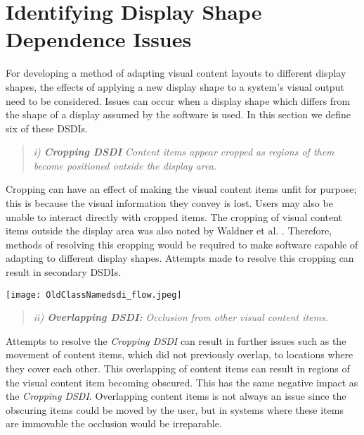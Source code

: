 \documentclass[review,5p,times,twocolumn]{elsarticle}
\begin{document}
\section{Identifying Display Shape Dependence Issues}
\label{sec:problem}

For developing a method of adapting visual content layouts to different display shapes, the effects of applying a new display shape to a system's visual output need to be considered.
Issues can occur when a display shape which differs from the shape of a display assumed by the software is used.
In this section we define six of these \acp{DSDI}.

\begin{quote}\emph{i) \textbf{Cropping \ac{DSDI}} Content items appear cropped as regions of them become positioned outside the display area.}\end{quote}

Cropping can have an effect of making the visual content items unfit for purpose; this is because the visual information they convey is lost.
Users may also be unable to interact directly with cropped items.
The cropping of visual content items outside the display area was also noted by Waldner et al. \cite{Waldner2011}.
Therefore, methods of resolving this cropping would be required to make software capable of adapting to different display shapes.
Attempts made to resolve this cropping can result in secondary \acp{DSDI}.

 \begin{figure*}[t]
 \centering
   \texttt{[image: OldClassNamedsdi\_flow.jpeg]}
   \caption{A flow chat mapping the causality of Display Shape Dependence Issues (DSDIs).}
   \label{fig:dsdiFlow}
\end{figure*}

\begin{quote}\emph{ii) \textbf{Overlapping \ac{DSDI}:} Occlusion from other visual content items.}\end{quote}

Attempts to resolve the {\emph{Cropping \ac{DSDI}}} can result in further issues such as the movement of content items, which did not previously overlap, to locations where they cover each other.
This overlapping of content items can result in regions of the visual content item becoming obscured.
This has the same negative impact as the {\emph{Cropping \ac{DSDI}}}.
Overlapping content items is not always an issue since the obscuring items could be moved by the user, but in systems where these items are immovable the occlusion would be irreparable.
\end{document}
